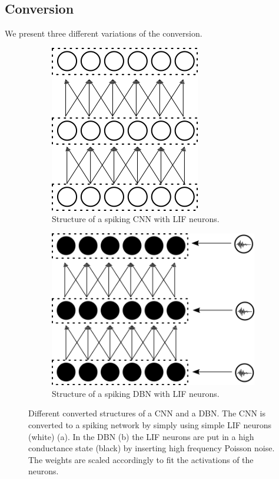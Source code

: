 \subsection{Conversion} \label{c:conversionappr}

We present three different variations of the conversion.

\begin{figure}
	\centering
	\begin{subfigure}[t]{.5\textwidth}
  		\centering
  		\includegraphics[width=.54\linewidth]{imgs/convert_cnn.png}
  		\caption{Structure of a spiking CNN with LIF neurons.}
  		\label{fig:converted1}
	\end{subfigure}%
	\begin{subfigure}[t]{.5\textwidth}
  		\centering
  		\includegraphics[width=.8\linewidth]{imgs/convert_dbn.png}
  		\caption{Structure of a spiking DBN with LIF neurons.}
  		\label{fig:converted2}
  	\end{subfigure}
	\caption[Different converted structures of an CNN and an DBN.]{Different converted structures of a CNN and a DBN. The CNN is converted to a spiking network by simply using simple LIF neurons (white) (a). In the DBN (b) the LIF neurons are put in a high conductance state (black) by inserting high frequency Poisson noise. The weights are scaled accordingly to fit the activations of the neurons.}
	\label{fig:converted}
\end{figure}


